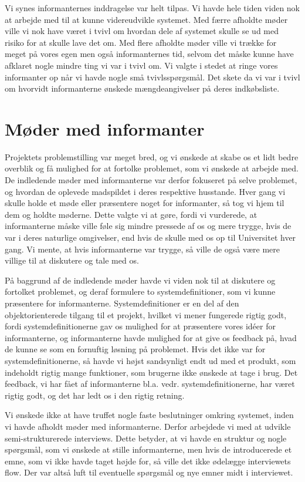 Vi synes informanternes inddragelse var helt tilpas. Vi havde hele tiden viden nok at arbejde med til at kunne videreudvikle systemet. Med færre afholdte møder ville vi nok have været i tvivl om hvordan dele af systemet skulle se ud med risiko for at skulle lave det om. Med flere afholdte møder ville vi trække for meget på vores egen men også informanternes tid, selvom det måske kunne have afklaret nogle mindre ting vi var i tvivl om. Vi valgte i stedet at ringe vores informanter op når vi havde nogle små tvivlsspørgsmål. Det skete \fx da vi var i tvivl om hvorvidt informanterne ønskede mængdeangivelser på deres indkøbsliste.

\section{Møder med informanter}
Projektets problemstilling var meget bred, og vi ønskede at skabe os et lidt bedre overblik og få mulighed for at fortolke problemet, som vi ønskede at arbejde med. De indledende møder med informanterne var derfor fokuseret på selve problemet, og hvordan de oplevede madspildet i deres respektive husstande. Hver gang vi skulle holde et møde eller præsentere noget for informanter, så tog vi hjem til dem og holdte møderne. Dette valgte vi at gøre, fordi vi vurderede, at informanterne måske ville føle sig mindre pressede af os og mere trygge, hvis de var i deres naturlige omgivelser, end hvis de skulle med os op til Universitet hver gang. Vi mente, at hvis informanterne var trygge, så ville de også være mere villige til at diskutere og tale med os.

På baggrund af de indledende møder havde vi viden nok til at diskutere og fortolket problemet, og deraf formulere to systemdefinitioner, som vi kunne præsentere for informanterne. Systemdefinitioner er en del af den objektorienterede tilgang til et projekt, hvilket vi mener fungerede rigtig godt, fordi systemdefinitionerne gav os mulighed for at præsentere vores idéer for informanterne, og informanterne havde mulighed for at give os feedback på, hvad de kunne se som en fornuftig løsning på problemet. Hvis det ikke var for systemdefinitionerne, så havde vi højst sandsynligt endt ud med et produkt, som indeholdt rigtig mange funktioner, som brugerne ikke ønskede at tage i brug. Det feedback, vi har fået af informanterne bl.a. vedr. systemdefinitionerne, har været rigtig godt, og det har ledt os i den rigtig retning. 

Vi ønskede ikke at have truffet nogle faste beslutninger omkring systemet, inden vi havde afholdt møder med informanterne. Derfor arbejdede vi med at udvikle semi-strukturerede interviews. Dette betyder, at vi havde en struktur og nogle spørgsmål, som vi ønskede at stille informanterne, men hvis de introducerede et emne, som vi ikke havde taget højde for, så ville det ikke ødelægge interviewets flow. Der var altså luft til eventuelle spørgsmål og nye emner midt i interviewet.

